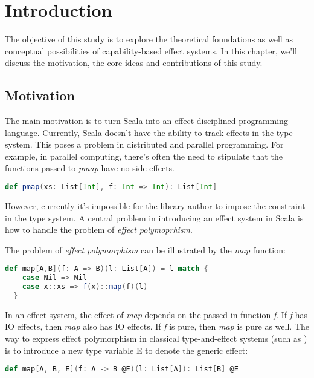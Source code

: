 \section{Introduction}

The objective of this study is to explore the theoretical foundations
as well as conceptual possibilities of capability-based effect
systems. In this chapter, we'll discuss the motivation, the core ideas
and contributions of this study.

\subsection{Motivation}

The main motivation is to turn Scala into an effect-disciplined
programming language. Currently, Scala doesn't have the ability to
track effects in the type system. This poses a problem in distributed
and parallel programming. For example, in parallel computing, there's
often the need to stipulate that the functions passed to \emph{pmap}
have no side effects.

\begin{lstlisting}[language=Scala]
def pmap(xs: List[Int], f: Int => Int): List[Int]
\end{lstlisting}

However, currently it's impossible for the library author to impose
the constraint in the type system. A central problem in introducing an
effect system in Scala is how to handle the problem of \emph{effect
  polymoprhism}.

The problem of \emph{effect polymorphism} can be illustrated by the
\emph{map} function:

\begin{lstlisting}[language=Scala]
  def map[A,B](f: A => B)(l: List[A]) = l match {
    case Nil => Nil
    case x::xs => f(x)::map(f)(l)
  }
\end{lstlisting}

In an effect system, the effect of \emph{map} depends on the passed in
function \emph{f}. If \emph{f} has IO effects, then \emph{map} also
has IO effects. If \emph{f} is pure, then \emph{map} is pure as
well. The way to express effect polymorphism in classical
type-and-effect systems (such as \cite{lucassen1988polymorphic}) is to
introduce a new type variable E to denote the generic effect:

\begin{lstlisting}[language=Scala]
def map[A, B, E](f: A -> B @E)(l: List[A]): List[B] @E
\end{lstlisting}

